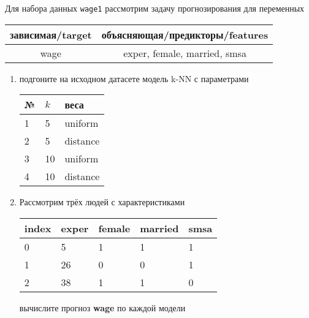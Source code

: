 \begin{exercise}
Для набора данных \texttt{wage1} рассмотрим задачу прогнозирования
для переменных
\begin{center}
	\begin{tabular}{|c|c|}\hline
		зависимая/target & объясняющая/предикторы/features \\ \hline
		wage & exper, female, married, smsa \\ \hline
	\end{tabular}
\end{center}
\begin{enumerate}
	\item подгоните на исходном датасете модель k-NN с параметрами
	\begin{center}
		\begin{tabular}{|l|l|l|}\hline
		№ & \(k\) & веса \\ \hline
		1 & 5 & uniform \\
		2 & 5 & distance \\
		3 & 10 & uniform \\
		4 & 10 & distance \\ \hline
		\end{tabular}
	\end{center}
	\item Рассмотрим трёх людей с характеристиками
	\begin{center}
		\begin{tabular}{|l||l|l|l|l|}\hline
			index & exper & female & married & smsa \\ \hline\hline
			0 & 5 & 1 & 1 & 1  \\
			1 & 26 & 0 & 0 & 1 \\
			2 & 38 & 1 & 1 & 0 \\ \hline
		\end{tabular}
	\end{center}
	вычислите прогноз \textbf{wage} по каждой модели
\end{enumerate}
\end{exercise}

